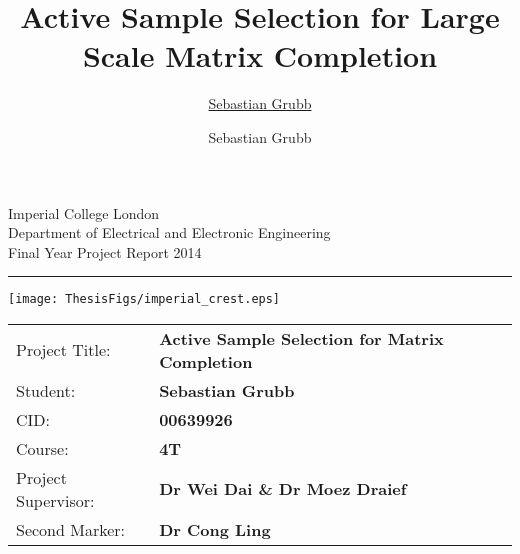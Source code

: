 \documentclass[twoside,11pt]{Classes/CUEDthesisPSnPDF}
\title{Active Sample Selection for Large Scale Matrix Completion}
\author{\href{mailto:sg3510@ic.ac.uk}{Sebastian Grubb}}
\author{Sebastian Grubb}
\newcounter{col}
\begin{document}
\begin{titlepage}
\setlength{\parindent}{0pt}
\setlength{\parskip}{0pt}

{
\Large
\raggedright
Imperial College London\\[12pt]
Department of Electrical and Electronic Engineering\\[12pt]
Final Year Project Report 2014\\[12pt]

}
\rule{\columnwidth}{3pt}

\vfill

\centering
\texttt{[image: ThesisFigs/imperial\_crest.eps]}

\vfill

\setlength{\tabcolsep}{0pt}
\begin{tabular}{p{40mm}p{\dimexpr\columnwidth-40mm}}
Project Title: & \textbf{Active Sample Selection for Matrix Completion} \\[12pt]
Student: & \textbf{Sebastian Grubb} \\[12pt] %
CID: & \textbf{00639926} \\[12pt]
Course: & \textbf{4T} \\[12pt]
Project Supervisor: & \textbf{Dr Wei Dai \& Dr Moez Draief} \\[12pt]
Second Marker: & \textbf{Dr Cong Ling} \\
\end{tabular}
\end{titlepage}

%   




\end{document}

